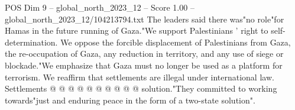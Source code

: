 \begin{textsample}{POS Dim 9 – global\_north\_2023\_12 – Score 1.00 – global\_north\_2023\_12/104213794.txt}
The leaders said there was"no role"for Hamas in the future running of Gaza."We support Palestinians ' right to self-determination.
We oppose the forcible displacement of Palestinians from Gaza, the re-occupation of Gaza, any reduction in territory, and any use of siege or blockade."We emphasize that Gaza must no longer be used as a platform for terrorism.
We reaffirm that settlements are illegal under international law.
Settlements @ @ @ @ @ @ @ @ @ @ solution."They committed to working towards"just and enduring peace in the form of a two-state solution".

\end{textsample}
